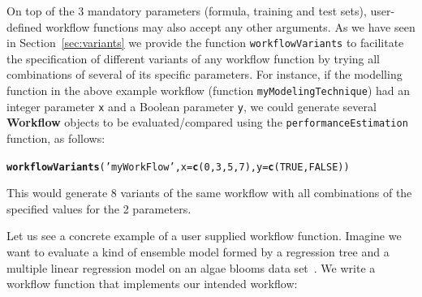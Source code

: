 \documentclass[10pt,a4paper]{article}\usepackage[]{graphicx}\usepackage[]{color}
\makeatletter
\newcommand{\hlnum}[1]{\textcolor[rgb]{0.686,0.059,0.569}{#1}}%
\newcommand{\hlstr}[1]{\textcolor[rgb]{0.192,0.494,0.8}{#1}}%
\newcommand{\hlstd}[1]{\textcolor[rgb]{0.345,0.345,0.345}{#1}}%
\newcommand{\hlkwc}[1]{\textcolor[rgb]{0.333,0.667,0.333}{#1}}%
\newcommand{\hlkwd}[1]{\textcolor[rgb]{0.737,0.353,0.396}{\textbf{#1}}}%
\newenvironment{kframe}{%
 \def\at@end@of@kframe{}%
 \ifinner\ifhmode%
  \def\at@end@of@kframe{\end{minipage}}%
  \begin{minipage}{\columnwidth}%
 \fi\fi%
 \def\FrameCommand##1{\hskip\@totalleftmargin \hskip-\fboxsep
 \colorbox{shadecolor}{##1}\hskip-\fboxsep
     \hskip-\linewidth \hskip-\@totalleftmargin \hskip\columnwidth}%
 \MakeFramed {\advance\hsize-\width
   \@totalleftmargin\z@ \linewidth\hsize
   \@setminipage}}%
 {\par\unskip\endMakeFramed%
 \at@end@of@kframe}
\newenvironment{knitrout}{}{} %
\makeatother
\begin{document}
On top of the 3 mandatory parameters (formula, training and test sets), user-defined workflow functions may also accept any other arguments. As we have seen in Section~\ref{sec:variants} we provide
the function \texttt{workflowVariants} to facilitate the specification of
different variants of any workflow function by trying all combinations
of several of its specific parameters. For instance, if the modelling
function in the above example workflow (function
\texttt{myModelingTechnique}) had an integer parameter \texttt{x}
and a Boolean parameter \texttt{y}, we could generate several
\textbf{Workflow} objects to be evaluated/compared using the
\texttt{performanceEstimation} function, as follows:

\begin{knitrout}\footnotesize
{}\color{fgcolor}\begin{kframe}
\begin{alltt}
\hlkwd{workflowVariants}\hlstd{(}\hlstr{'myWorkFlow'}\hlstd{,}\hlkwc{x}\hlstd{=}\hlkwd{c}\hlstd{(}\hlnum{0}\hlstd{,}\hlnum{3}\hlstd{,}\hlnum{5}\hlstd{,}\hlnum{7}\hlstd{),}\hlkwc{y}\hlstd{=}\hlkwd{c}\hlstd{(}\hlnum{TRUE}\hlstd{,}\hlnum{FALSE}\hlstd{))}
\end{alltt}
\end{kframe}
\end{knitrout}

This would generate 8 variants of the same workflow with all
combinations of the specified values for the 2 parameters.  

Let us see a concrete example of a user supplied workflow
function. Imagine we want to evaluate a kind of ensemble model formed
by a regression tree and a multiple linear regression model on an
algae blooms data set~\cite{Tor10}.  We write a workflow function that implements our intended workflow:
\end{document}
